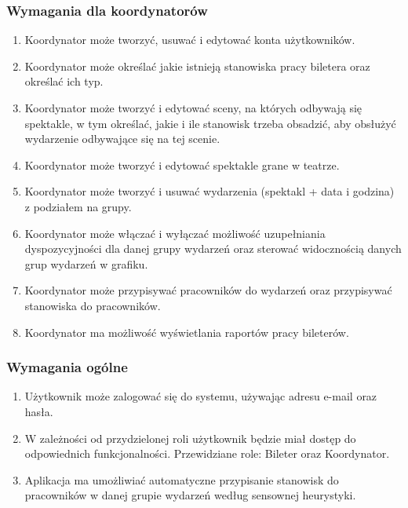 \documentclass[shortabstract]{iithesis}
\begin{document}
\subsubsection*{Wymagania dla koordynatorów}
\begin{enumerate}
  \item Koordynator może tworzyć, usuwać i edytować konta użytkowników.
  \item Koordynator może określać jakie istnieją stanowiska pracy biletera oraz określać ich typ.
  \item Koordynator może tworzyć i edytować sceny, na których odbywają się spektakle, w tym określać, jakie i ile stanowisk trzeba obsadzić, aby obsłużyć wydarzenie odbywające się na tej scenie.
  \item Koordynator może tworzyć i edytować spektakle grane w teatrze.
  \item Koordynator może tworzyć i usuwać wydarzenia (spektakl + data i godzina) z podziałem na grupy.
  \item Koordynator może włączać i wyłączać możliwość uzupełniania dyspozycyjności dla danej grupy wydarzeń oraz sterować widocznością danych grup wydarzeń w grafiku.
  \item Koordynator może przypisywać pracowników do wydarzeń oraz przypisywać stanowiska do pracowników.
  \item Koordynator ma możliwość wyświetlania raportów pracy bileterów.
\end{enumerate}

\subsubsection*{Wymagania ogólne}
\begin{enumerate}
  \item Użytkownik może zalogować się do systemu, używając adresu e-mail oraz hasła.
  \item W zależności od przydzielonej roli użytkownik będzie miał dostęp do odpowiednich funkcjonalności. Przewidziane role: Bileter oraz Koordynator.
  \item Aplikacja ma umożliwiać automatyczne przypisanie stanowisk do pracowników w danej grupie wydarzeń według sensownej heurystyki.
\end{enumerate}
\end{document}
